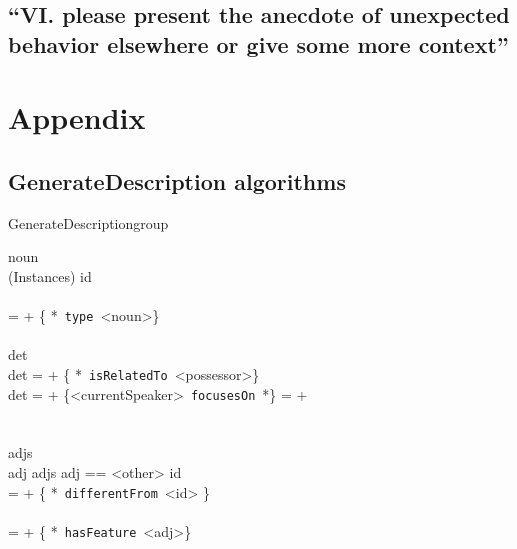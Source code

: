 \documentclass[11pt]{article}
\begin{document}
\subsection{``VI. please present the anecdote of unexpected behavior elsewhere
or give some more context''}


\section{Appendix}

\subsection{GenerateDescription algorithms}
\label{GenerateDescription}
\begin{pseudocode}[ruled]{GenerateDescription}{group}
\label{algo|GenerateDescription}

   noun \GETS {} \\ 
   \IF {} \in (Instances) \THEN
   		\BEGIN
		id \GETS {}\\	
		\\
		\END
   \ELSE
    	 =  + \{ *\ {\tt type}\ <noun>\} \\
   
   \\
   det \GETS {} \\
   \IF det  \THEN
        =  + \{ *\ {\tt isRelatedTo}\ <possessor>\} \\
    
    \IF det  \THEN
        \BEGIN
        \IF {} \THEN 
             =  + \{<currentSpeaker>\ {\tt focusesOn}\ *\}
        \ELSE
             =  +  \\
        \END \\
   \\
   adjs \GETS {} \\
   \FOREACH adj \in adjs \DO
   	\BEGIN
   		\IF adj == <other> \THEN 
   			\BEGIN
   			id \GETS {} \\
   			 =  + \{ *\ {\tt differentFrom}\ <id> \}\\
   			\\
			\END   		
   		\ELSE
	     	 =  + \{ *\ {\tt hasFeature}\ <adj>\} \\
    \END\\
    

\end{pseudocode}
\end{document}
